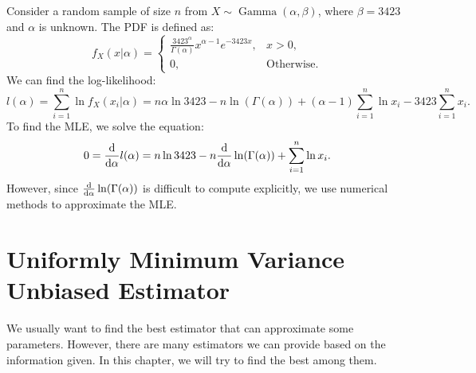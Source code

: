 \documentclass{huhtakm-template-book-v2}
\DeclareMathOperator{\Gam}{Gamma}
\begin{document}
    \begin{eg}
        Consider a random sample of size $n$ from $X \sim \Gam(\alpha, \beta)$, where $\beta = 3423$ and $\alpha$ is unknown. The PDF is defined as:
        \begin{equation*}
            f_{X}(x | \alpha) = \begin{cases}
                \frac{3423^{\alpha}}{\Gamma(\alpha)} x^{\alpha - 1} e^{-3423x}, &x > 0,\\
                0, &\text{Otherwise}.
            \end{cases}
        \end{equation*}
        We can find the log-likelihood:
        \begin{equation*}
            l(\alpha) = \sum_{i=1}^{n} \ln{f_{X}(x_{i} | \alpha)} = n\alpha\ln{3423} - n\ln(\Gamma(\alpha)) + (\alpha - 1)\sum_{i=1}^{n} \ln{x_{i}} - 3423\sum_{i=1}^{n} x_{i}.
        \end{equation*}
        To find the MLE, we solve the equation:
        \begin{equation*}
            0 = \odv*{}{\alpha}l(\alpha) = n\ln{3423} - n\odv*{}{\alpha}\ln(\Gamma(\alpha)) + \sum_{i=1}^{n} \ln{x_{i}}.
        \end{equation*}
        However, since $\odv*{}{\alpha}\ln(\Gamma(\alpha))$ is difficult to compute explicitly, we use numerical methods to approximate the MLE.
    \end{eg}
    
\chapter{Uniformly Minimum Variance Unbiased Estimator}
    We usually want to find the best estimator that can approximate some parameters. However, there are many estimators we can provide based on the information given. In this chapter, we will try to find the best among them.
\end{document}
